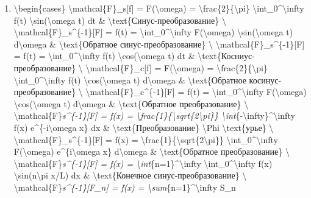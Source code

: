 \documentclass[
]{article}
\providecommand{\tightlist}{%
  \setlength{\itemsep}{0pt}\setlength{\parskip}{0pt}}
\begin{document}
{{\begin{enumerate}
\def\labelenumi{\arabic{enumi}.}
\tightlist
\item
  \textbackslash begin\{cases\} \textbackslash mathcal\{F\}\_s{[}f{]} =
  F(\textbackslash omega) =
  \textbackslash frac\{2\}\{\textbackslash pi\}
  \textbackslash int\_0\^{}\textbackslash infty f(t)
  \textbackslash sin(\textbackslash omega t) dt \&
  \textbackslash text\{Синус-преобразование\} \textbackslash{}
  \textbackslash mathcal\{F\}\_s\^{}\{-1\}{[}F{]} = f(t) =
  \textbackslash int\_0\^{}\textbackslash infty F(\textbackslash omega)
  \textbackslash sin(\textbackslash omega t) d\textbackslash omega \&
  \textbackslash text\{Обратное синус-преобразование\} \textbackslash{}
  \textbackslash mathcal\{F\}\_s\^{}\{-1\}{[}F{]} = f(t) =
  \textbackslash int\_0\^{}\textbackslash infty f(t)
  \textbackslash cos(\textbackslash omega t) dt \&
  \textbackslash text\{Косниус-преобразование\} \textbackslash{}
  \textbackslash mathcal\{F\}\_c{[}f{]} = F(\textbackslash omega) =
  \textbackslash frac\{2\}\{\textbackslash pi\}
  \textbackslash int\_0\^{}\textbackslash infty f(t)
  \textbackslash cos(\textbackslash omega t) d\textbackslash omega \&
  \textbackslash text\{Обратное косинус-преобразование\}
  \textbackslash{} \textbackslash mathcal\{F\}\_c\^{}\{-1\}{[}F{]} =
  f(t) = \textbackslash int\_0\^{}\textbackslash infty
  F(\textbackslash omega) \textbackslash cos(\textbackslash omega t)
  d\textbackslash omega \& \textbackslash text\{Обратное
  преобразование\} \textbackslash{}
  \textbackslash mathcal\{F\}\emph{s\^{}\{-1\}{[}F{]} = f(x) =
  \textbackslash frac\{1\}\{\textbackslash sqrt\{2\textbackslash pi\}\}
  \textbackslash int}\{-\textbackslash infty\}\^{}\textbackslash infty
  f(x) e\^{}\{-i\textbackslash omega x\} dx \&
  \textbackslash text\{Преобразование\} \textbackslash Phi
  \textbackslash text\{урье\} \textbackslash{}
  \textbackslash mathcal\{F\}\_s\^{}\{-1\}{[}F{]} = f(x) =
  \textbackslash frac\{1\}\{\textbackslash sqrt\{2\textbackslash pi\}\}
  \textbackslash int\_0\^{}\textbackslash infty F(\textbackslash omega)
  e\^{}\{i\textbackslash omega x\} d\textbackslash omega \&
  \textbackslash text\{Обратное преобразование\} \textbackslash{}
  \textbackslash mathcal\{F\}\emph{s\^{}\{-1\}{[}F{]} = f(x) =
  \textbackslash int}\{n=1\}\^{}\textbackslash infty
  \textbackslash int\_0\^{}\textbackslash infty f(x)
  \textbackslash sin(n\textbackslash pi x/L) dx \&
  \textbackslash text\{Конечное синус-преобразование\} \textbackslash{}
  \textbackslash mathcal\{F\}\emph{s\^{}\{-1\}{[}F\_n{]} = f(x) =
  \textbackslash sum}\{n=1\}\^{}\textbackslash infty S\_n

\end{enumerate}}}
\end{document}
